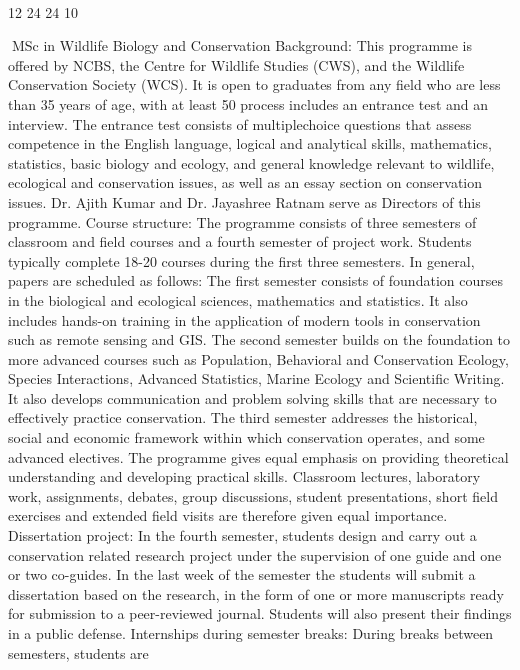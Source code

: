 \documentclass[a4paper,10pt]{article}
\begin{document}
  

12
24
24
10	
  

MSc in Wildlife Biology and Conservation
Background: This programme is offered by NCBS, the Centre for Wildlife Studies (CWS),
and the Wildlife Conservation Society (WCS). It is open to graduates from any field who are
less than 35 years of age, with at least 50%
process includes an entrance test and an interview. The entrance test consists of multiplechoice questions that assess competence in the English language, logical and analytical
skills, mathematics, statistics, basic biology and ecology, and general knowledge relevant to
wildlife, ecological and conservation issues, as well as an essay section on conservation
issues. Dr. Ajith Kumar and Dr. Jayashree Ratnam serve as Directors of this programme.
Course structure: The programme consists of three semesters of classroom and field
courses and a fourth semester of project work. Students typically complete 18-20 courses
during the first three semesters. In general, papers are scheduled as follows: The first
semester consists of foundation courses in the biological and ecological sciences,
mathematics and statistics. It also includes hands-on training in the application of modern
tools in conservation such as remote sensing and GIS. The second semester builds on the
foundation to more advanced courses such as Population, Behavioral and Conservation
Ecology, Species Interactions, Advanced Statistics, Marine Ecology and Scientific Writing.
It also develops communication and problem solving skills that are necessary to effectively
practice conservation. The third semester addresses the historical, social and economic
framework within which conservation operates, and some advanced electives. The
programme gives equal emphasis on providing theoretical understanding and developing
practical skills. Classroom lectures, laboratory work, assignments, debates, group
discussions, student presentations, short field exercises and extended field visits are
therefore given equal importance.
Dissertation project: In the fourth semester, students design and carry out a conservation
related research project under the supervision of one guide and one or two co-guides. In the
last week of the semester the students will submit a dissertation based on the research, in the
form of one or more manuscripts ready for submission to a peer-reviewed journal. Students
will also present their findings in a public defense.
Internships during semester breaks: During breaks between semesters, students are
\end{document}
